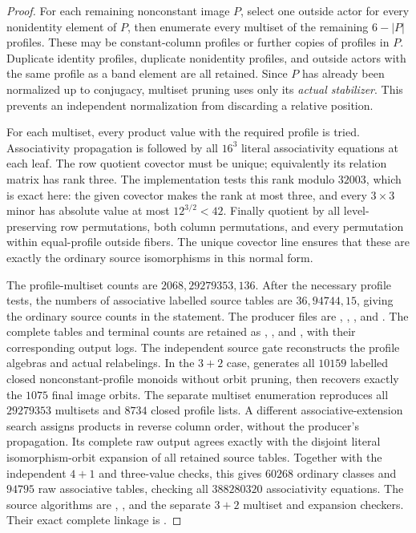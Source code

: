\begin{proof}
For each remaining nonconstant image $P$, select one outside actor
for every nonidentity element of $P$, then enumerate every multiset
of the remaining $6-|P|$ profiles. These may be constant-column
profiles or further copies of profiles in $P$. Duplicate identity
profiles, duplicate nonidentity profiles, and outside actors with
the same profile as a band element are all retained.
Since $P$ has already been normalized up to conjugacy, multiset
pruning uses only its \emph{actual stabilizer}. This prevents an
independent normalization from discarding a relative position.

For each multiset, every product value with the required profile
is tried. Associativity propagation is followed by all $16^3$
literal associativity equations at each leaf. The row quotient
covector must be unique; equivalently its relation matrix has rank
three. The implementation tests this rank modulo $32003$, which
is exact here: the given covector makes the rank at most three,
and every $3\times3$ minor has absolute value at most
$12^{3/2}<42$.
Finally quotient by all level-preserving row permutations, both
column permutations, and every permutation within equal-profile
outside fibers. The unique covector line ensures that these are
exactly the ordinary source isomorphisms in this normal form.

The profile-multiset counts are $2068,29279353,136$.
After the necessary profile tests, the numbers of associative
labelled source tables are $36,94744,15$, giving the ordinary
source counts in the statement. The producer files are
,
,
, and
.
The complete tables and terminal counts are retained as
,
, and
, with their
corresponding output logs.
The independent source gate reconstructs the profile algebras and
actual relabelings.  In the $3+2$ case,
 generates all $10159$
labelled closed nonconstant-profile monoids without orbit pruning,
then recovers exactly the $1075$ final image orbits.  The separate
multiset enumeration reproduces all $29279353$ multisets and $8734$
closed profile lists.  A different associative-extension search assigns
products in reverse column order, without the producer's propagation.
Its complete raw output agrees exactly with the disjoint literal
isomorphism-orbit expansion of all retained source tables.
Together with the independent $4+1$ and three-value checks, this gives
$60268$ ordinary classes and $94795$ raw associative tables, checking
all $388280320$ associativity equations.  The source algorithms are
,
, and the separate
$3+2$ multiset and expansion checkers.  Their exact complete linkage is
.
\end{proof}

